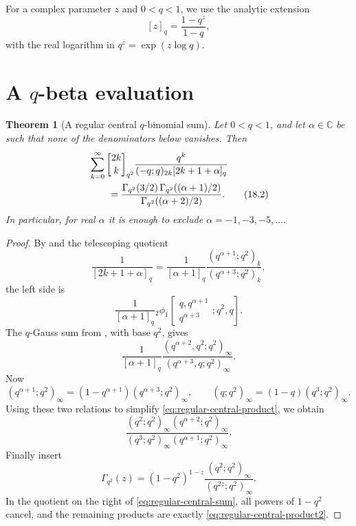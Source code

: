 \documentclass[11pt,oneside,openany]{book}
\newtheorem{theorem}{Theorem}[chapter]
\theoremstyle{definition}
\theoremstyle{remark}
\newcommand{\Qbinom}[3]{\genfrac{[}{]}{0pt}{}{#1}{#2}_{#3}}
\newcommand{\C}{\mathbb C}
\begin{document}
For a complex parameter $z$ and $0<q<1$, we use the analytic extension
\[
 [z]_q=\frac{1-q^z}{1-q},
\]
with the real logarithm in $q^z=\exp(z\log q)$.

\section{A \texorpdfstring{$q$}{q}-beta evaluation}

\begin{theorem}[A regular central $q$-binomial sum]\label{thm:regular-central-sum}
Let $0<q<1$, and let $\alpha\in\C$ be such that none of the denominators below vanishes.  Then
\begin{align}
 &\sum_{k=0}^{\infty}
 \Qbinom{2k}{k}{q^2}
 \frac{q^k}{(-q;q)_{2k}[2k+1+\alpha]_q}
 \notag\\
 &\qquad=
 \frac{\Gamma_{q^2}(3/2)\,
       \Gamma_{q^2}((\alpha+1)/2)}
      {\Gamma_{q^2}((\alpha+2)/2)}.
 \tag{18.2}\label{eq:regular-central-sum}
\end{align}
In particular, for real $\alpha$ it is enough to exclude
$\alpha=-1,-3,-5,\ldots$.
\end{theorem}

\begin{proof}
By  and the telescoping quotient
\[
 \frac1{[2k+1+\alpha]_q}
 =\frac1{[\alpha+1]_q}
   \frac{(q^{\alpha+1};q^2)_k}
        {(q^{\alpha+3};q^2)_k},
\]
the left side is
\[
 \frac1{[\alpha+1]_q}
 {}_2\phi_1\!\left[
 \begin{matrix}q,q^{\alpha+1}\\q^{\alpha+3}\end{matrix};
 q^2,q\right].
\]
The $q$-Gauss sum from , with base $q^2$, gives
\[
 \frac1{[\alpha+1]_q}
 \frac{(q^{\alpha+2},q^2;q^2)_\infty}
      {(q^{\alpha+3},q;q^2)_\infty}.
 \tag{18.3}\label{eq:regular-central-product}
\]
Now
\[
 (q^{\alpha+1};q^2)_\infty
 =(1-q^{\alpha+1})(q^{\alpha+3};q^2)_\infty,
 \qquad
 (q;q^2)_\infty=(1-q)(q^3;q^2)_\infty.
\]
Using these two relations to simplify \eqref{eq:regular-central-product}, we obtain
\[
 \frac{(q^2;q^2)_\infty(q^{\alpha+2};q^2)_\infty}
 {(q^3;q^2)_\infty(q^{\alpha+1};q^2)_\infty}.
 \tag{18.4}\label{eq:regular-central-product2}
\]
Finally insert
\[
 \Gamma_{q^2}(z)
 =(1-q^2)^{1-z}
 \frac{(q^2;q^2)_\infty}{(q^{2z};q^2)_\infty}.
\]
In the quotient on the right of \eqref{eq:regular-central-sum}, all powers of $1-q^2$ cancel, and the remaining products are exactly \eqref{eq:regular-central-product2}.
\end{proof}
\end{document}
